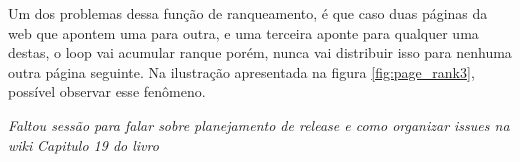Um dos problemas dessa função de ranqueamento, é que caso duas páginas da web que apontem uma para outra, e uma terceira aponte para qualquer uma destas, o loop vai acumular ranque porém, nunca vai distribuir isso para nenhuma outra página seguinte. Na ilustração apresentada na figura \ref{fig:page_rank3}, possível observar esse fenômeno.


\textit{Faltou sessão para falar sobre planejamento de release e como organizar issues na wiki}
\textit{Capitulo 19 do livro}
